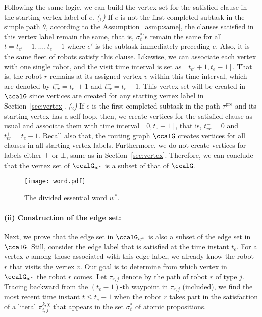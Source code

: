 \documentclass[Afour,sageh,times]{sagej}
\newcounter{mycounter}
\renewcommand{\ap}[3]{\mathcal{\pi}_{{#1},{#2}}^{#3}}
\begin{document}
{{
Following the same logic, we can build the vertex set for the satisfied clause in the starting vertex label of $e$. {\it ($_1$)} If $e$ is not the first completed subtask in the simple path $\theta$,  according to the Assumption~\ref{asmp:same}, the clauses satisfied in this vertex label remain the same, that is, $\sigma^*_t$'s remain the same for all $t= t_{e'}+1, \ldots, t_{e}-1$ where $e'$ is the subtask immediately preceding $e$. Also, it is the same fleet of robots satisfy this clause. Likewise, we can associate each vertex with one single robot, and the visit time interval is set as $[t_{e'}+1, t_{e}-1]$. That is, the robot $r$ remains at its assigned vertex $v$  within this time interval,
which are denoted by $t_{vr}^- = t_{e'}+1$ and $t_{vr}^+ = t_{e}-1$. This vertex set will be created in $\ccalG$ since vertices are created for any starting vertex label in Section~\ref{sec:vertex}. {\it ($_2$)} \label{app:vertex_b} If  $e$ is the first completed subtask in the path $\tau^\text{pre}$ and its starting vertex has a self-loop, then,  we create vertices for the satisfied clause as usual and associate them with time interval $[0, t_e-1]$, that is, $t_{vr}^-=0$ and $t_{vr}^+ = t_e-1$. Recall also that, the routing graph $\ccalG$ creates vertices for all clauses in all starting  vertex labels.
Furthermore, we do not create vertices for labels either $\top$ or $\bot$, same as in Section~\ref{sec:vertex}. Therefore, we can conclude that the vertex set of $\ccalG_{w^*}$ is a subset of that of $\ccalG$.



\begin{figure}[!t]
  \centering
  \texttt{[image: word.pdf]}
  \caption{The divided essential word $w^*$.}
  \label{fig:word}
\end{figure}

\paragraph{(ii) Construction of the edge set:}\label{app:edge_set} Next, we prove that the edge set in $\ccalG_{w^*}$ is also a subset of the edge set in $\ccalG$. Still, consider the edge label that is satisfied at the time instant $t_e$. For a vertex $v$ among those associated with this edge label, we already know the robot $r$ that visits the vertex $v$. Our goal is to determine from which vertex in $\ccalG_{w^*}$ the robot $r$ comes. Let $\tau_{r,j}$ denote by the path of robot $r$ of type $j$. Tracing backward from the $(t_{e}-1)$-th waypoint in $\tau_{r,j}$ (included), we find the most recent time instant $t\leq t_e -1$  when the robot $r$ takes part in the satisfaction of a literal $\ap{i}{j}{k,\chi}$ that appears in the set $\sigma^*_{t}$ of atomic propositions. 

}}
\end{document}
